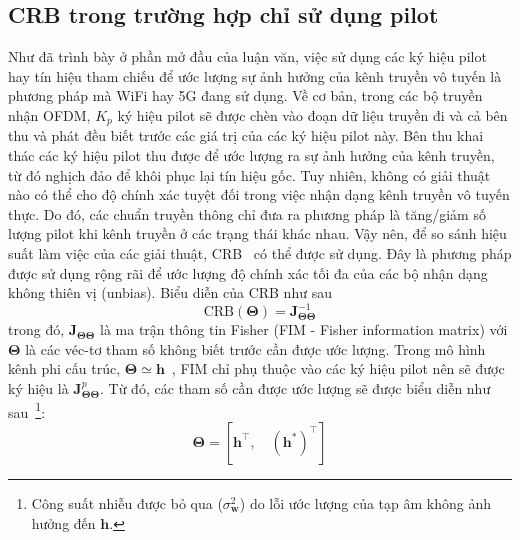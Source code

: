 \subsection{CRB trong trường hợp chỉ sử dụng pilot}

Như đã trình bày ở phần mở đầu của luận văn, việc sử dụng các ký hiệu pilot hay tín hiệu tham chiếu để ước lượng sự ảnh hưởng của kênh truyền vô tuyến là phương pháp mà WiFi hay 5G đang sử dụng. Về cơ bản, trong các bộ truyền nhận OFDM, $K_p$ ký hiệu pilot sẽ được chèn vào đoạn dữ liệu truyền đi và cả bên thu và phát đều biết trước các giá trị của các ký hiệu pilot này. Bên thu khai thác các ký hiệu pilot thu được để ước lượng ra sự ảnh hưởng của kênh truyền, từ đó nghịch đảo để khôi phục lại tín hiệu gốc. Tuy nhiên, không có giải thuật nào có thể cho độ chính xác tuyệt đối trong việc nhận dạng kênh truyền vô tuyến thực. Do đó, các chuẩn truyền thông chỉ đưa ra phương pháp là tăng/giảm số lượng pilot khi kênh truyền ở các trạng thái khác nhau. Vậy nên, để so sánh hiệu suất làm việc của các giải thuật, CRB~\cite{Kay1993} có thể được sử dụng. Đây là phương pháp được sử dụng rộng rãi để ước lượng độ chính xác tối đa của các bộ nhận dạng không thiên vị (unbias). Biểu diễn của CRB như sau
\begin{equation}
    \text{CRB}(\boldsymbol{\Theta}) = \mathbf{J}_{\boldsymbol{\Theta}\boldsymbol{\Theta}}^{-1}
\end{equation}
trong đó, $\mathbf{J}_{\boldsymbol{\Theta}\boldsymbol{\Theta}}$ là ma trận thông tin Fisher (FIM - Fisher information matrix) với $\boldsymbol{\Theta}$ là các véc-tơ tham số không biết trước cần được ước lượng. Trong mô hình kênh phi cấu trúc, $\boldsymbol{\Theta} \simeq	 \mathbf{h}$~\cite{Ladaycia2017}, FIM chỉ phụ thuộc vào các ký hiệu pilot nên sẽ được ký hiệu là $\mathbf{J}_{\boldsymbol{\Theta}\boldsymbol{\Theta}}^p$. Từ đó, các tham số cần được ước lượng sẽ được biểu diễn như sau~\cite{Menni2012}\footnote{Công suất nhiễu được bỏ qua ($\sigma^2_{\mathbf{w}}$) do lỗi ước lượng của tạp âm không ảnh hưởng đến $\mathbf{h}$.}:
\begin{equation}
    \boldsymbol{\Theta}=\left[\mathbf{h}^{\top},  \quad  \left(\mathbf{h}^{*}\right)^{\top}\right]
\end{equation}

